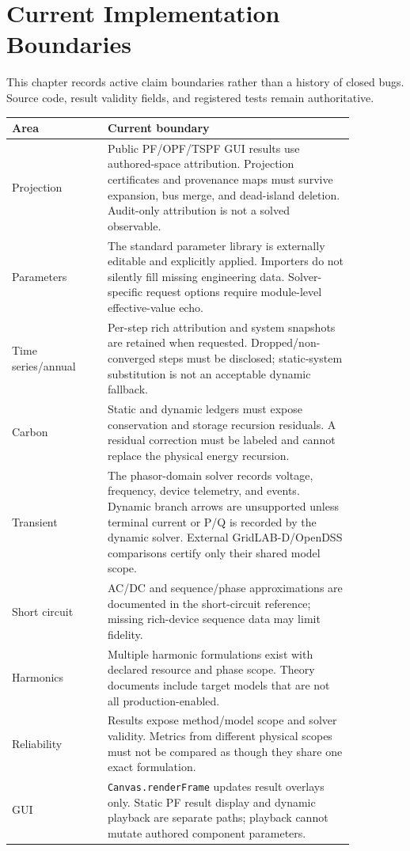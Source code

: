\section{Current Implementation Boundaries}
\label{sec:implementation_gap_audit}

This chapter records active claim boundaries rather than a history of closed
bugs.  Source code, result validity fields, and registered tests remain
authoritative.

\begin{longtable}{L{0.24\linewidth}L{0.62\linewidth}}
\toprule
Area & Current boundary \\
\midrule
\endhead
Projection & Public PF/OPF/TSPF GUI results use authored-space attribution. Projection certificates and provenance maps must survive expansion, bus merge, and dead-island deletion. Audit-only attribution is not a solved observable. \\
Parameters & The standard parameter library is externally editable and explicitly applied. Importers do not silently fill missing engineering data. Solver-specific request options require module-level effective-value echo. \\
Time series/annual & Per-step rich attribution and system snapshots are retained when requested. Dropped/non-converged steps must be disclosed; static-system substitution is not an acceptable dynamic fallback. \\
Carbon & Static and dynamic ledgers must expose conservation and storage recursion residuals. A residual correction must be labeled and cannot replace the physical energy recursion. \\
Transient & The phasor-domain solver records voltage, frequency, device telemetry, and events. Dynamic branch arrows are unsupported unless terminal current or P/Q is recorded by the dynamic solver. External GridLAB-D/OpenDSS comparisons certify only their shared model scope. \\
Short circuit & AC/DC and sequence/phase approximations are documented in the short-circuit reference; missing rich-device sequence data may limit fidelity. \\
Harmonics & Multiple harmonic formulations exist with declared resource and phase scope. Theory documents include target models that are not all production-enabled. \\
Reliability & Results expose method/model scope and solver validity. Metrics from different physical scopes must not be compared as though they share one exact formulation. \\
GUI & \texttt{Canvas.renderFrame} updates result overlays only. Static PF result display and dynamic playback are separate paths; playback cannot mutate authored component parameters. \\
\bottomrule
\end{longtable}

